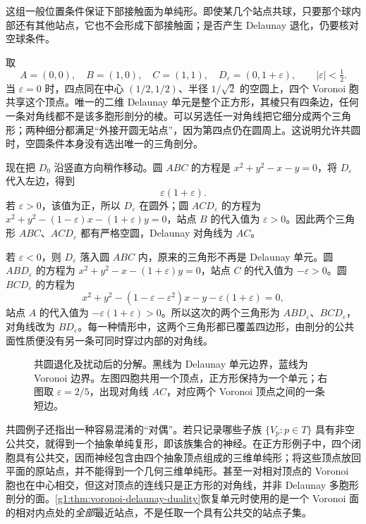 这组一般位置条件保证下部接触面为单纯形。即使某几个站点共球，只要那个球内部还有其他站点，它也不会形成下部接触面；是否产生 Delaunay 退化，仍要核对空球条件。

\begin{example}\label{g1:exm:delaunay-square-perturbation}
	取
	\[
		A=(0,0),\quad B=(1,0),\quad C=(1,1),\quad D_\varepsilon=(0,1+\varepsilon),
		\qquad |\varepsilon|<\tfrac12.
	\]
	当 \(\varepsilon=0\) 时，四点同在中心 \((1/2,1/2)\)、半径 \(1/\sqrt2\) 的空圆上，四个 Voronoi 胞共享这个顶点。唯一的二维 Delaunay 单元是整个正方形，其棱只有四条边，任何一条对角线都不是该多胞形剖分的棱。可以另选任一对角线把它细分成两个三角形；两种细分都满足“外接开圆无站点”，因为第四点仍在圆周上。这说明允许共圆时，空圆条件本身没有选出唯一的三角剖分。

	现在把 \(D_0\) 沿竖直方向稍作移动。圆 \(ABC\) 的方程是 \(x^2+y^2-x-y=0\)，将 \(D_\varepsilon\) 代入左边，得到
	\[
		\varepsilon(1+\varepsilon).
	\]
	若 \(\varepsilon>0\)，该值为正，所以 \(D_\varepsilon\) 在圆外；圆 \(ACD_\varepsilon\) 的方程为 \(x^2+y^2-(1-\varepsilon)x-(1+\varepsilon)y=0\)，站点 \(B\) 的代入值为 \(\varepsilon>0\)。因此两个三角形 \(ABC\)、\(ACD_\varepsilon\) 都有严格空圆，Delaunay 对角线为 \(AC\)。

	若 \(\varepsilon<0\)，则 \(D_\varepsilon\) 落入圆 \(ABC\) 内，原来的三角形不再是 Delaunay 单元。圆 \(ABD_\varepsilon\) 的方程为 \(x^2+y^2-x-(1+\varepsilon)y=0\)，站点 \(C\) 的代入值为 \(-\varepsilon>0\)。圆 \(BCD_\varepsilon\) 的方程为
	\[
		x^2+y^2-(1-\varepsilon-\varepsilon^2)x-y-\varepsilon(1+\varepsilon)=0,
	\]
	站点 \(A\) 的代入值为 \(-\varepsilon(1+\varepsilon)>0\)。所以这次的两个三角形为 \(ABD_\varepsilon\)、\(BCD_\varepsilon\)，对角线改为 \(BD_\varepsilon\)。每一种情形中，这两个三角形都已覆盖四边形，由剖分的公共面性质便没有另一条可同时穿过内部的对角线。
\end{example}

\begin{figure}[htbp]
	\centering
	
	\caption[共圆退化及扰动后的分解]{共圆退化及扰动后的分解。黑线为 Delaunay 单元边界，蓝线为 Voronoi 边界。左图四胞共用一个顶点，正方形保持为一个单元；右图取 \(\varepsilon=2/5\)，出现对角线 \(AC\)，对应两个 Voronoi 顶点之间的一条短边。}
	\label{g1:fig:voronoi-degeneracy}
\end{figure}

共圆例子还指出一种容易混淆的“对偶”。若只记录哪些子族 \(\{V_p:p\in T\}\) 具有非空公共交，就得到一个抽象单纯复形，即该族集合的神经。在正方形例子中，四个闭胞具有公共交，因而神经包含由四个抽象顶点组成的三维单纯形；将这些顶点放回平面的原站点，并不能得到一个几何三维单纯形。甚至一对相对顶点的 Voronoi 胞也在中心相交，但这对顶点的连线只是正方形的对角线，并非 Delaunay 多胞形剖分的面。\cref{g1:thm:voronoi-delaunay-duality}恢复单元时使用的是一个 Voronoi 面的相对内点处的\emph{全部}最近站点，不是任取一个具有公共交的站点子集。

